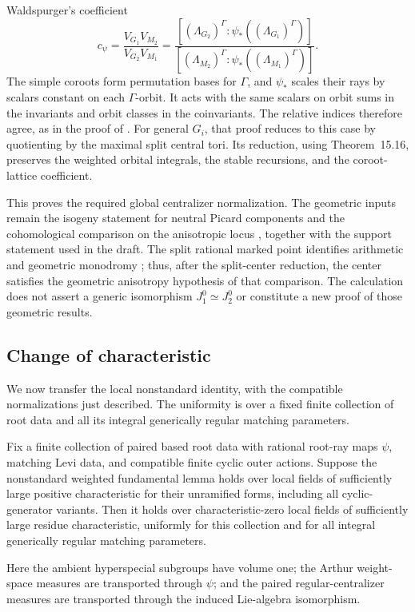 Waldspurger's coefficient
\[
 c_\psi=\frac{V_{G_1}V_{M_2}}{V_{G_2}V_{M_1}}=
 \frac{[(\Lambda_{G_2})^\Gamma:
                         \psi_*((\Lambda_{G_1})^\Gamma)]}
      {[(\Lambda_{M_2})^\Gamma:
                         \psi_*((\Lambda_{M_1})^\Gamma)]}.
\]
The simple coroots form permutation bases for
$\Gamma$, and $\psi_*$ scales their rays by scalars constant on each
$\Gamma$-orbit.  It acts with the same scalars on orbit sums in the
invariants and orbit classes in the coinvariants.  The relative
indices therefore agree, as in the proof of
\citet[Corollary~17.11]{HalleckDubeWFLDraft}.
For general $G_i$, that proof reduces to this case by quotienting by
the maximal split central tori.  Its reduction, using Theorem~15.16,
preserves the weighted orbital integrals, the stable recursions, and
the coroot-lattice coefficient.

This proves the required global centralizer normalization.  The
geometric inputs remain the isogeny statement for neutral Picard
components and the cohomological comparison on the anisotropic locus
\citep[Proposition~4.18.1 and Theorem~8.8.2]{Ngo2010FundamentalLemma},
together with the support statement used in the draft.  The split
rational marked point identifies arithmetic and geometric monodromy
\citep[Proposition~2.21 and Corollary~2.22]{HalleckDubeWFLDraft};
thus, after the split-center reduction, the center satisfies the
geometric anisotropy hypothesis of that comparison.  The calculation
does not assert a generic isomorphism $J_1^0\simeq J_2^0$ or constitute
a new proof of those geometric results.

\subsection{Change of characteristic}

We now transfer the local nonstandard identity, with the compatible
normalizations just described.  The uniformity is over a fixed finite
collection of root data and all its integral generically regular
matching parameters.

\begin{lemma}
\label{lem:nonstandard-change-characteristic}
Fix a finite collection of paired based root data with rational
root-ray maps $\psi$, matching Levi data, and compatible finite cyclic
outer actions.  Suppose the nonstandard weighted fundamental lemma
holds over local fields of sufficiently large positive characteristic
for their unramified forms, including all cyclic-generator variants.
Then it holds over characteristic-zero local fields of sufficiently
large residue characteristic, uniformly for this collection and for
all integral generically regular matching parameters.

Here the ambient hyperspecial subgroups have volume one; the Arthur
weight-space measures are transported through $\psi$; and the paired
regular-centralizer measures are transported through the induced
Lie-algebra isomorphism.
\end{lemma}

